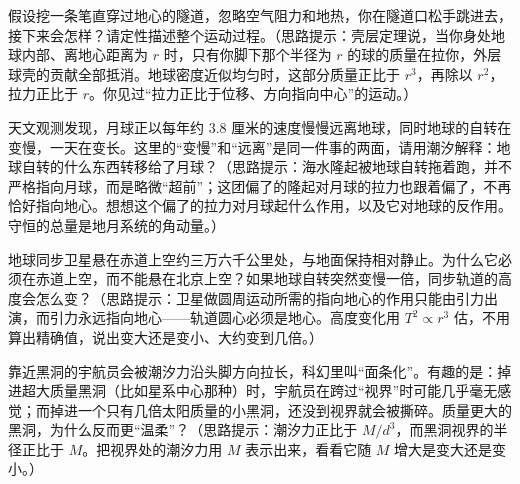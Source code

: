 \begin{puzzles}
\item 假设挖一条笔直穿过地心的隧道，忽略空气阻力和地热，你在隧道口松手跳进去，接下来会怎样？请定性描述整个运动过程。（思路提示：壳层定理说，当你身处地球内部、离地心距离为 \(r\) 时，只有你脚下那个半径为 \(r\) 的球的质量在拉你，外层球壳的贡献全部抵消。地球密度近似均匀时，这部分质量正比于 \(r^{3}\)，再除以 \(r^{2}\)，拉力正比于 \(r\)。你见过“拉力正比于位移、方向指向中心”的运动。）

\item 天文观测发现，月球正以每年约 \(3.8\) 厘米的速度慢慢远离地球，同时地球的自转在变慢，一天在变长。这里的“变慢”和“远离”是同一件事的两面，请用潮汐解释：地球自转的什么东西转移给了月球？（思路提示：海水隆起被地球自转拖着跑，并不严格指向月球，而是略微“超前”；这团偏了的隆起对月球的拉力也跟着偏了，不再恰好指向地心。想想这个偏了的拉力对月球起什么作用，以及它对地球的反作用。守恒的总量是地月系统的角动量。）

\item 地球同步卫星悬在赤道上空约三万六千公里处，与地面保持相对静止。为什么它必须在赤道上空，而不能悬在北京上空？如果地球自转突然变慢一倍，同步轨道的高度会怎么变？（思路提示：卫星做圆周运动所需的指向地心的作用只能由引力出演，而引力永远指向地心——轨道圆心必须是地心。高度变化用 \(T^{2}\propto r^{3}\) 估，不用算出精确值，说出变大还是变小、大约变到几倍。）

\item 靠近黑洞的宇航员会被潮汐力沿头脚方向拉长，科幻里叫“面条化”。有趣的是：掉进超大质量黑洞（比如星系中心那种）时，宇航员在跨过“视界”时可能几乎毫无感觉；而掉进一个只有几倍太阳质量的小黑洞，还没到视界就会被撕碎。质量更大的黑洞，为什么反而更“温柔”？（思路提示：潮汐力正比于 \(M/d^{3}\)，而黑洞视界的半径正比于 \(M\)。把视界处的潮汐力用 \(M\) 表示出来，看看它随 \(M\) 增大是变大还是变小。）
\end{puzzles}

